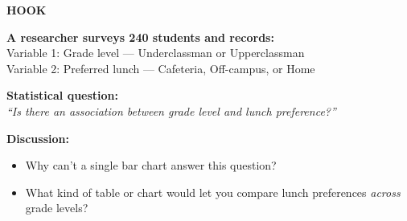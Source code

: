 \documentclass[aspectratio=169, 11pt]{beamer}
\begin{document}
{
\begin{frame}[t, plain]
  \vspace{0.45cm}\par
  \hspace{0.55cm}%
  \begin{minipage}{0.9\textwidth}

    {\color{white}\bfseries\footnotesize\MakeUppercase{Hook}}

    \vspace{0.3cm}
    {\color{white}\large\bfseries A researcher surveys 240 students and records:}\\[0.3cm]
    {\color{skymid} Variable 1: Grade level --- Underclassman or Upperclassman}\\[0.15cm]
    {\color{skymid} Variable 2: Preferred lunch --- Cafeteria, Off-campus, or Home}

    \vspace{0.5cm}
    {\color{goldacc}\bfseries Statistical question:}\\[0.2cm]
    {\color{white}\itshape ``Is there an association between grade level and lunch preference?''}

    \vspace{0.5cm}
    {\color{white}\bfseries Discussion:}
    \begin{itemize}
      \setlength{\itemsep}{0.35em}
      \item {\color{white}Why can't a single bar chart answer this question?}
      \item {\color{white}What kind of table or chart would let you compare lunch
        preferences \emph{across} grade levels?}
    \end{itemize}

  \end{minipage}
\end{frame}
}
\end{document}
